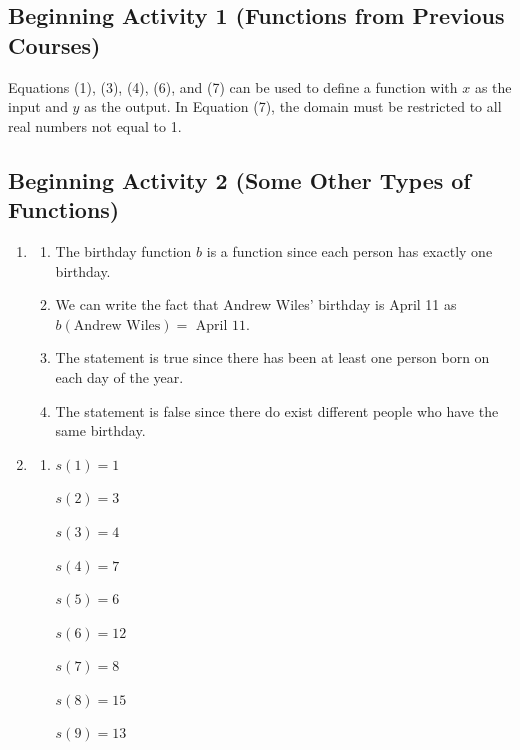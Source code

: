 \documentclass[11pt]{article}
\begin{document}
\subsection*{Beginning Activity 1 (Functions from Previous Courses)}

Equations (1), (3), (4), (6), and (7) can be used to define a function with  $x$  as the input and  $y$  as the output.  In Equation (7), the domain must be restricted to all real numbers not equal to 1.
\hbreak

\noindent
\subsection*{Beginning Activity 2 (Some Other Types of Functions)}
\begin{enumerate}
\item \begin{enumerate}
\item The birthday function  $b$  is  a function since each person has exactly one birthday.

\item We can write the fact that Andrew Wiles'  birthday is April 11 as 
$b( {\text{Andrew Wiles}} ) = \text{ April 11}$.

\item The statement is true since there has been at least one person born on each day of the year.

\item The statement is false since there do exist different people who have the same birthday.
\end{enumerate}


\item \begin{enumerate}

\item \begin{multicols}{4}
$s( 1 ) = 1$	

$s( 2 ) = 3$	

$s( 3 ) = 4$	

$s( 4 ) = 7$

$s( 5 ) = 6$	

$s( 6 ) = 12$	

$s( 7 ) = 8$	

$s( 8 ) = 15$

$s( 9 ) = 13$	


\end{multicols}
\end{enumerate}
\end{enumerate}
\end{document}
